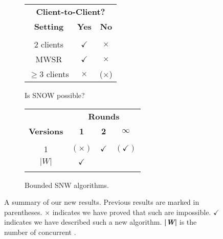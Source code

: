 \begin{figure}[t]
  \centering
  \begin{subfigure}[b]{0.49\columnwidth} {
      \begin{center}
\begin{tabular}{@{}c c c@{}}
  \midrule
                   \multicolumn{3}{c}{\phantom{ABCDef}\textbf{Client-to-Client?}}\\
  \textbf{Setting} & \textbf{Yes}        & \textbf{No}\\
  \hline\\[-1.8ex]
  2 clients        & $\checkmark$   & $\times$ \\
  MWSR             & $\checkmark$   & $\times$ \\
  $\ge 3$ clients  & $\times$       & ($\times$)\\
  \midrule
\end{tabular}
      \end{center}
    }
    \caption{Is SNOW possible?}
    \label{fig:contr_table_a}
  \end{subfigure}
  \hfill
  \begin{subfigure}[b]{0.49\columnwidth} {
      \begin{center}
\begin{tabular}{@{}c c c c@{}}
  \midrule          
  & \multicolumn{3}{c}{\phantom{a}\textbf{Rounds}}\\
  \textbf{Versions} & \textbf{1}    & \textbf{2}    & $\boldsymbol{\infty}$ \\
  \hline\\[-1.8ex]
                1   & $(\times)$    & $\checkmark$  & $(\checkmark)$ \\
              $|W|$ & $\checkmark$  &  & \\
  \midrule\\
\end{tabular}
      \end{center}
    }
    \caption{Bounded SNW algorithms.}
    \label{fig:contr_table_b}
  \end{subfigure} 
  \caption{A summary of our new results.  Previous results are marked in parentheses.
    $\times$ indicates we have proved that such \rots{} are impossible.
    $\checkmark$ indicates we have described such a new \rot{} algorithm. %
    \textbf{|\textit{W}|} is the number of concurrent \wots{}.}
  \label{tbl:result_map}
  \vspace{-1.5em}
\end{figure}

